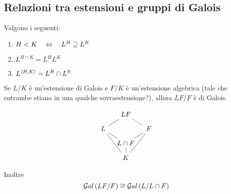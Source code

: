 \subsection{Relazioni tra estensioni e gruppi di Galois}
\begin{multicols}{2}
	\begin{prop}
		Valgono i seguenti:
		\begin{enumerate}
			\item  $ H < K \quad\Leftrightarrow\quad L^H \supseteq L^K $
			\item $ L^{H \cap K} = L^H L^K $
			\item $ L^{\langle H, K \rangle} = L^H \cap L^S $
		\end{enumerate}
		
	\end{prop}
	
	\begin{theorem}\label{galrandom}
		Se $ L/K $ è un'estensione di Galois e $ F/K $ è un'estensione algebrica (tale che entrambe stiano in una qualche sovraestensione?), allora $ LF/F $ è di Galois. 
		
		\[\begin{tikzcd}[row sep=0.25cm, column sep=0.3cm]
		 & LF \arrow[dl,-] \arrow[dr,-, dashed] &  \\
		L \arrow[ddr,-] \arrow[dr,-] &  & F \arrow [ddl,-] \\
		& L\cap F \arrow[ur,-] \arrow[d,-]  & \\
		& K &
		\end{tikzcd} \]
		
		Inoltre
		\[ \mathcal{G}al\left( LF/F \right) \cong \mathcal{G}al\left( L / L\cap F \right) \]
	\end{theorem}
	

\end{multicols}
